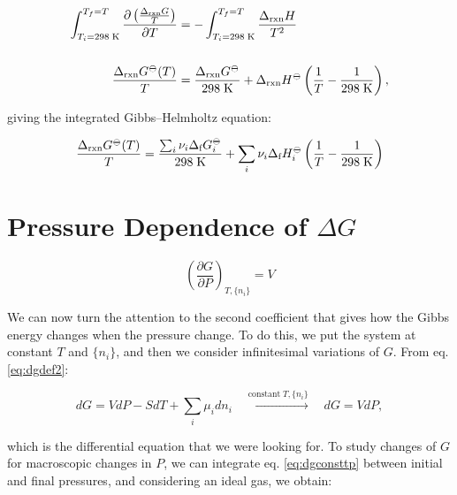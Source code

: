 \documentclass[
  9pt,
]{extbook}
\theoremstyle{definition}
\theoremstyle{definition}
\theoremstyle{definition}
\theoremstyle{definition}
\theoremstyle{remark}
\begin{document}
\begin{equation}
\begin{aligned}
\int_{T_i=298 \;\text{K}}^{T_f=T}  \frac{\partial\left( \frac{\Delta_{\text{rxn}} G}{T} \right)}{\partial T} &=  - \int_{T_i=298 \;\text{K}}^{T_f=T}  \frac{\Delta_{\text{rxn}} H}{T^2} \\ \\ \frac{\Delta_{\text{rxn}} G^{-\kern-6pt{\ominus}\kern-6pt-}(T)}{T} &=  \frac{\Delta_{\text{rxn}} G^{-\kern-6pt{\ominus}\kern-6pt-}}{298 \;\text{K}} + \Delta_{\text{rxn}} H^{-\kern-6pt{\ominus}\kern-6pt-}\left( \frac{1}{T} -\frac{1}{298 \;\text{K}} \right),
\end{aligned}
\label{eq:gibbshelmIbase}
\end{equation}

giving the integrated Gibbs--Helmholtz equation:

\begin{equation}
\frac{\Delta_{\text{rxn}} G^{-\kern-6pt{\ominus}\kern-6pt-}(T)}{T} =  \frac{\sum_i \nu_i \Delta_{\text{f}} G_i^{-\kern-6pt{\ominus}\kern-6pt-}}{298 \;\text{K}} + \sum_i \nu_i \Delta_{\text{f}} H_i^{-\kern-6pt{\ominus}\kern-6pt-}\left( \frac{1}{T} -\frac{1}{298 \;\text{K}} \right)
\label{eq:gibbshelmI}
\end{equation}

\section{\texorpdfstring{Pressure Dependence of \(\Delta G\)}{Pressure Dependence of \textbackslash Delta G}}\label{pressure-dependence-of-delta-g}

\[
\left(\frac{\partial G}{\partial P} \right)_{T,\{n_i\}}=V
\]

We can now turn the attention to the second coefficient that gives how the Gibbs energy changes when the pressure change. To do this, we put the system at constant \(T\) and \(\{n_i\}\), and then we consider infinitesimal variations of \(G\). From eq. \eqref{eq:dgdef2}:

\begin{equation}
dG = VdP -SdT +\sum_i\mu_i dn_i \quad \xrightarrow{\text{constant}\; T,\{n_i\}} \quad dG = VdP,
\label{eq:dgconsttp}
\end{equation}

which is the differential equation that we were looking for. To study changes of \(G\) for macroscopic changes in \(P\), we can integrate eq. \eqref{eq:dgconsttp} between initial and final pressures, and considering an ideal gas, we obtain:
\end{document}
